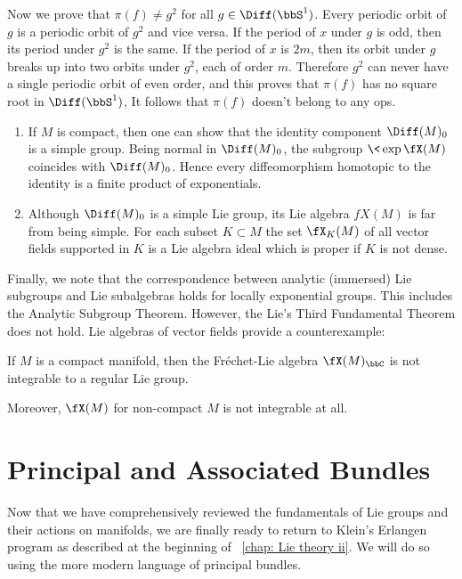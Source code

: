\begin{example}
    Now we prove that $\pi(f)\neq g^2$ for all $g\in\Diff(\bbS^1)$. Every periodic orbit of $g$ is a periodic  orbit of $g^2$ and vice versa. If the period of $x$ under $g$ is odd, then its period under $g^2$ is the same. If the period of $x$ is $2m$, then its orbit under $g$ breaks up into two orbits under $g^2$, each of order $m$. Therefore $g^2$ can never have a single periodic orbit of even order, and this proves that $\pi(f)$ has no square root in $\Diff(\bbS^1)$, It follows that $\pi(f)$ doesn't belong to any \gls{ops}.
\end{example}

\begin{rem}
    \begin{enumerate}[label=(\alph*)]
        \item If $M$ is compact, then one can show that the identity component $\Diff(M)_0$ is a simple group. Being normal in $\Diff(M)_0$, the subgroup $\<\exp\fX(M)\>$ coincides with $\Diff(M)_0$. Hence every diffeomorphism homotopic to the identity is a finite product of exponentials.
        \item  Although $\Diff(M)_0$ is a simple Lie group, its Lie algebra $fX(M)$ is far from being simple. For each subset $K\subset M$ the set $\fX_K(M)$ of all vector fields supported in $K$ is a Lie algebra ideal which is proper if $K$ is not dense.
    \end{enumerate}
\end{rem}

Finally, we note that the correspondence between analytic (immersed) Lie subgroups and Lie subalgebras holds for locally exponential groups. This includes the Analytic Subgroup Theorem. However, the Lie's Third Fundamental Theorem does not hold. Lie algebras of vector fields provide a counterexample:
\begin{thm}[Lempert]
    If $M$ is a compact manifold, then the Fr\'echet-Lie algebra $\fX(M)_\bbC$ is not integrable to a regular Lie group.
\end{thm}
Moreover, $\fX(M)$ for non-compact $M$ is not integrable at all.







\clearpage 
\chapter{Principal and Associated Bundles}

    Now that we have comprehensively reviewed the fundamentals of Lie groups and their actions on manifolds, we are finally ready to return to Klein's Erlangen program as described at the beginning of \Chap~\ref{chap: Lie theory ii}. We will do so using the more modern language of principal bundles.

